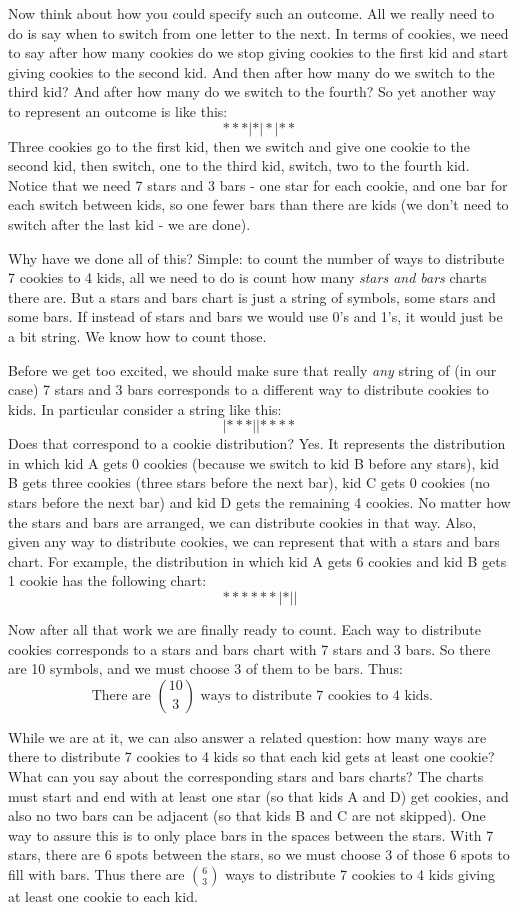\documentclass[12pt]{article}
\begin{document}
Now think about how you could specify such an outcome.  All we really need to do is say when to switch from one letter to the next. In terms of cookies, we need to say after how many cookies do we stop giving cookies to the first kid and start giving cookies to the second kid.  And then after how many do we switch to the third kid?  And after how many do we switch to the fourth?  So yet another way to represent an outcome is like this:
\[***|*|*|**\]
Three cookies go to the first kid, then we switch and give one cookie to the second kid, then switch, one to the third kid, switch, two to the fourth kid.  Notice that we need 7 stars and 3 bars - one star for each cookie, and one bar for each switch between kids, so one fewer bars than there are kids (we don't need to switch after the last kid - we are done).

Why have we done all of this?  Simple: to count the number of ways to distribute 7 cookies to 4 kids, all we need to do is count how many {\em stars and bars} charts there are.  But a stars and bars chart is just a string of symbols, some stars and some bars.  If instead of stars and bars we would use 0's and 1's, it would just be a bit string.  We know how to count those.

Before we get too excited, we should make sure that really {\em any} string of (in our case) 7 stars and 3 bars corresponds to a different way to distribute cookies to kids.  In particular consider a string like this:
\[|***||****\]
Does that correspond to a cookie distribution?  Yes.  It represents the distribution in which kid A gets 0 cookies (because we switch to kid B before any stars), kid B gets three cookies (three stars before the next bar), kid C gets 0 cookies (no stars before the next bar) and kid D gets the remaining 4 cookies.  No matter how the stars and bars are arranged, we can distribute cookies in that way.  Also, given any way to distribute cookies, we can represent that with a stars and bars chart.  For example, the distribution in which kid A gets 6 cookies and kid B gets 1 cookie has the following chart:
\[******|*||\]

Now after all that work we are finally ready to count.  Each way to distribute cookies corresponds to a stars and bars chart with 7 stars and 3 bars.  So there are 10 symbols, and we must choose 3 of them to be bars.  Thus:
\[\mbox{ There are }{10 \choose 3}\mbox{ ways to distribute 7 cookies to 4 kids.}\]

While we are at it, we can also answer a related question: how many ways are there to distribute 7 cookies to 4 kids so that each kid gets at least one cookie?  What can you say about the corresponding stars and bars charts?  The charts must start and end with at least one star (so that kids A and D) get cookies, and also no two bars can be adjacent (so that kids B and C are not skipped).  One way to assure this is to only place bars in the spaces between the stars.  With 7 stars, there are 6 spots between the stars, so we must choose 3 of those 6 spots to fill with bars.  Thus there are ${6 \choose 3}$ ways to distribute 7 cookies to 4 kids giving at least one cookie to each kid.
\end{document}
